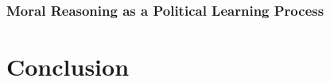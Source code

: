\documentclass{beamer}
\begin{document}
\subsection{}
\begin{frame}%
  \frametitle{Moral Reasoning as a Political Learning Process}
  \begin{figure}[ht]\centering
  \end{figure}
\end{frame}

\section{Conclusion}
\end{document}
